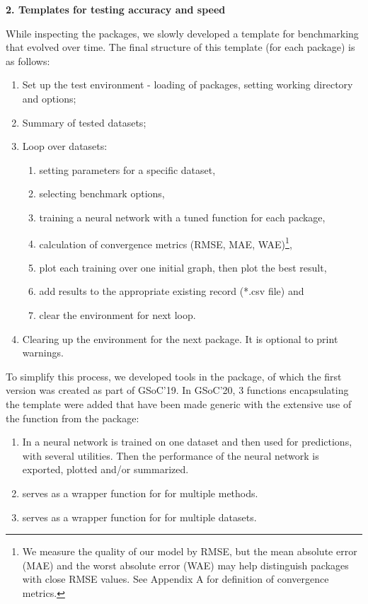 \textbf{2. Templates for testing accuracy and speed}

While inspecting the packages, we slowly developed a template for
benchmarking that evolved over time. The final structure of this
template (for each package) is as follows:

\begin{enumerate}
\def\labelenumi{\arabic{enumi}.}
\tightlist
\item
  Set up the test environment - loading of packages, setting working
  directory and options;
\item
  Summary of tested datasets;
\item
  Loop over datasets:

  \begin{enumerate}
  \def\labelenumii{\alph{enumii}.}
  \tightlist
  \item
    setting parameters for a specific dataset,
  \item
    selecting benchmark options,
  \item
    training a neural network with a tuned function for each package,
  \item
    calculation of convergence metrics (RMSE, MAE, WAE)\footnote{We
      measure the quality of our model by RMSE, but the mean absolute
      error (MAE) and the worst absolute error (WAE) may help
      distinguish packages with close RMSE values. See Appendix A for
      definition of convergence metrics.},
  \item
    plot each training over one initial graph, then plot the best
    result,
  \item
    add results to the appropriate existing record (*.csv file) and
  \item
    clear the environment for next loop.
  \end{enumerate}
\item
  Clearing up the environment for the next package. It is optional to
  print warnings.
\end{enumerate}

To simplify this process, we developed tools in the 
package, of which the first version was created as part of GSoC'19. In
GSoC'20, 3 functions encapsulating the template were added that have
been made generic with the extensive use of the  function
from the  package:

\begin{enumerate}
\def\labelenumi{\arabic{enumi}.}
\tightlist
\item
  In  a neural network is trained on one
  dataset and then used for predictions, with several utilities. Then
  the performance of the neural network is exported, plotted and/or
  summarized.
\item
   serves as a wrapper function for
   for multiple methods.
\item
   serves as a wrapper function for
   for multiple datasets.
\end{enumerate}

